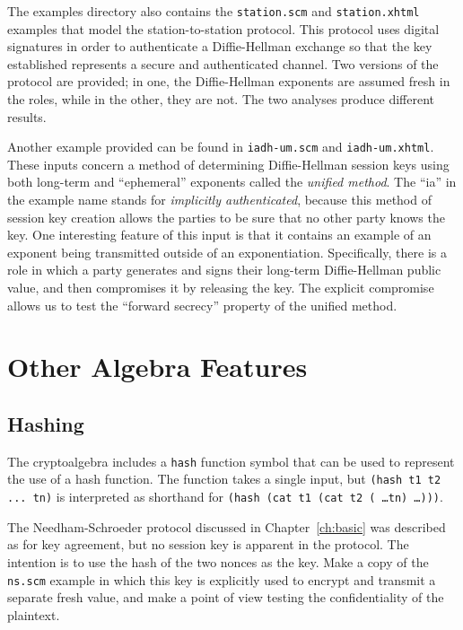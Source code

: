   The examples directory also contains the
\texttt{station.scm} and \texttt{station.xhtml} examples that model
the station-to-station protocol.  This protocol uses digital
signatures in order to authenticate a Diffie-Hellman exchange so that
the key established represents a secure and authenticated channel.
Two versions of the protocol are provided; in one, the Diffie-Hellman
exponents are assumed fresh in the roles, while in the other, they are
not.  The two analyses produce different results.

  Another example
provided can be found in \texttt{iadh-um.scm} and
\texttt{iadh-um.xhtml}.  These inputs concern a method of determining
Diffie-Hellman session keys using both long-term and ``ephemeral''
exponents called the \emph{unified method}.  The ``ia'' in the example
name stands for \emph{implicitly authenticated}, because this method
of session key creation allows the parties to be sure that no other
party knows the key.  One interesting feature of this input is that it
contains an example of an exponent being transmitted outside of an
exponentiation.  Specifically, there is a role in which a party
generates and signs their long-term Diffie-Hellman public value, and
then compromises it by releasing the key.  The explicit compromise
allows us to test the ``forward secrecy'' property of the unified
method.

\section{Other Algebra Features}
\label{sec:other_algebra}

\subsection{Hashing}
  The {\cpsa} cryptoalgebra
includes a \texttt{hash} function symbol that can be used to represent
the use of a hash function.  The function takes a single input, but
\texttt{(hash t1 t2 ... tn)} is interpreted as shorthand for
\texttt{(hash (cat t1 (cat t2 ( \ldots tn) \ldots )))}.

\begin{exercise}
  The Needham-Schroeder protocol discussed in Chapter~\ref{ch:basic}
  was described as for key agreement, but no session key is apparent
  in the protocol.  The intention is to use the hash of the two nonces
  as the key.  Make a copy of the \texttt{ns.scm} example in which
  this key is explicitly used to encrypt and transmit a separate fresh
  value, and make a point of view testing the confidentiality of the
  plaintext.
\end{exercise}

